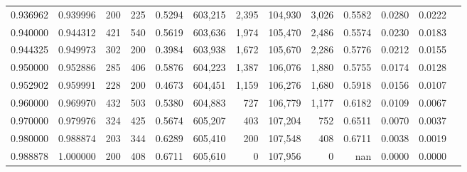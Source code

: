 \begin{tabular}{rrrrrrrrrrrrr}
0.936962 & 0.939996 &   200 & 225 &                                     0.5294 & 603,215 &   2,395 & 104,930 &   3,026 & 0.5582 & 0.0280 & 0.0222 \\
0.940000 & 0.944312 &   421 & 540 &                                     0.5619 & 603,636 &   1,974 & 105,470 &   2,486 & 0.5574 & 0.0230 & 0.0183 \\
0.944325 & 0.949973 &   302 & 200 &                                     0.3984 & 603,938 &   1,672 & 105,670 &   2,286 & 0.5776 & 0.0212 & 0.0155 \\
0.950000 & 0.952886 &   285 & 406 &                                     0.5876 & 604,223 &   1,387 & 106,076 &   1,880 & 0.5755 & 0.0174 & 0.0128 \\
0.952902 & 0.959991 &   228 & 200 &                                     0.4673 & 604,451 &   1,159 & 106,276 &   1,680 & 0.5918 & 0.0156 & 0.0107 \\
0.960000 & 0.969970 &   432 & 503 &                                     0.5380 & 604,883 &     727 & 106,779 &   1,177 & 0.6182 & 0.0109 & 0.0067 \\
0.970000 & 0.979976 &   324 & 425 &                                     0.5674 & 605,207 &     403 & 107,204 &     752 & 0.6511 & 0.0070 & 0.0037 \\
0.980000 & 0.988874 &   203 & 344 &                                     0.6289 & 605,410 &     200 & 107,548 &     408 & 0.6711 & 0.0038 & 0.0019 \\
0.988878 & 1.000000 &   200 & 408 &                                     0.6711 & 605,610 &       0 & 107,956 &       0 &    nan & 0.0000 & 0.0000 \\
\bottomrule
\end{tabular}

